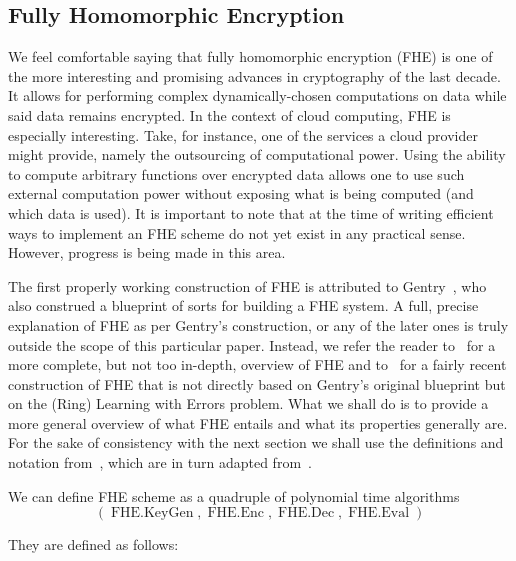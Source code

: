 \documentclass[11pt, a4paper]{article}
\newcommand{\op}[1]{\operatorname{#1}}
\begin{document}


\subsection{Fully Homomorphic Encryption}

We feel comfortable saying that fully homomorphic encryption (FHE) is one of the more interesting and promising advances in cryptography of the last decade.
It allows for performing complex dynamically-chosen computations on data while said data remains encrypted.
In the context of cloud computing, FHE is especially interesting.
Take, for instance, one of the services a cloud provider might provide, namely the outsourcing of computational power.
Using the ability to compute arbitrary functions over encrypted data allows one to use such external computation power without exposing what is being computed (and which data is used).
It is important to note that at the time of writing efficient ways to implement an FHE scheme do not yet exist in any practical sense.
However, progress is being made in this area.

The first properly working construction of FHE is attributed to Gentry~\cite{gentry2009fully}, who also construed a blueprint of sorts for building a FHE system.
A full, precise explanation of FHE as per Gentry's construction, or any of the later ones is truly outside the scope of this particular paper.
Instead, we refer the reader to~\cite{vaikuntanathan2011computing} for a more complete, but not too in-depth, overview of FHE and to~\cite{brakerski2012leveled} for a fairly recent construction of FHE that is not directly based on Gentry's original blueprint but on the (Ring) Learning with Errors problem.
What we shall do is to provide a more general overview of what FHE entails and what its properties generally are.
For the sake of consistency with the next section we shall use the definitions and notation from~\cite{goldwasser2013reusable}, which are in turn adapted from~\cite{vaikuntanathan2011computing}.

We can define FHE scheme as a quadruple of polynomial time algorithms 
\[
    (\op{FHE.KeyGen}, \op{FHE.Enc}, \op{FHE.Dec}, \op{FHE.Eval})
\]

They are defined as follows:
\end{document}
